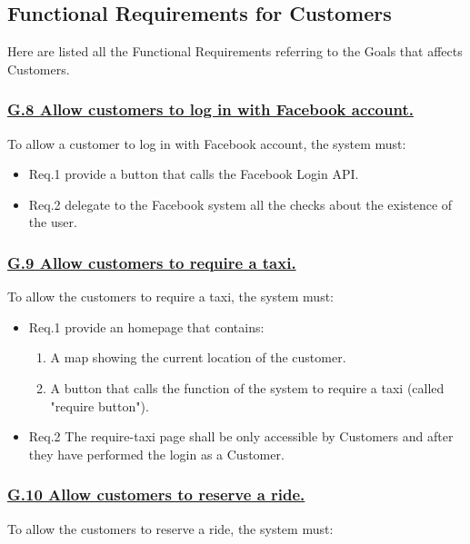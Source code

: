 		\subsection{Functional Requirements for Customers}
		Here are listed all the Functional Requirements referring to the Goals that affects Customers.

			\subsubsection{\lbrack \hyperref[sec:g8]{G.8 Allow customers to log in with Facebook account.}\rbrack}\label{sec:frs8}
			To allow a customer to log in with Facebook account, the system must:

				\begin{itemize}
					\item \lbrack Req.1\rbrack \label{sec:fr1_g8} provide a button that calls the Facebook Login API.
					\item \lbrack Req.2\rbrack \label{sec:fr2_g8} delegate to the Facebook system all the checks about the existence of the user.
				\end{itemize}

			\subsubsection{\lbrack \hyperref[sec:g9]{G.9 Allow customers to require a taxi.}\rbrack}\label{sec:frs9}
			To allow the customers to require a taxi, the system must:

				\begin{itemize}
					\item \lbrack Req.1\rbrack \label{sec:fr1_g9} provide an homepage that contains:
						\begin{enumerate}
							\item A map showing the current location of the customer.
							\item A button that calls the function of the system to require a taxi (called "require button").
						\end{enumerate}
					\item \lbrack Req.2\rbrack \label{sec:fr2_g9} The require-taxi page shall be only accessible by Customers and after they have performed the login as a Customer.
				\end{itemize}

			\subsubsection{\lbrack \hyperref[sec:g10]{G.10 Allow customers to reserve a ride.}\rbrack}\label{sec:frs10}
			To allow the customers to reserve a ride, the system must:

